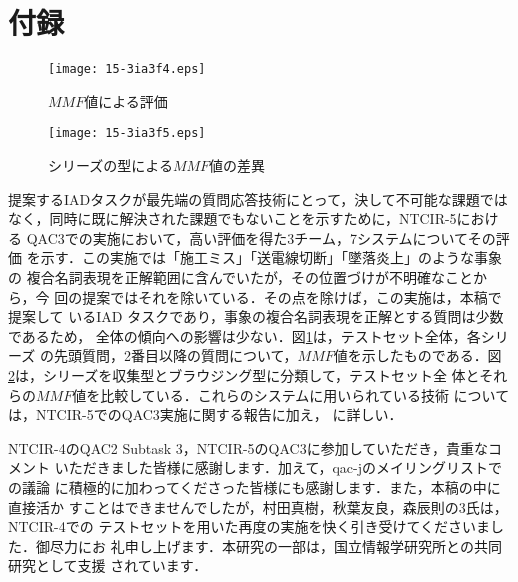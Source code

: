 \documentclass[japanese]{jnlp_1.4}
\begin{document}
\section*{付録}

\begin{figure}[b]
\centerline{\texttt{[image: 15-3ia3f4.eps]}}
\caption{$\mathit{MMF}$値による評価}
\label{mmf1}
\end{figure}
\begin{figure}[b]
\centerline{\texttt{[image: 15-3ia3f5.eps]}}
\caption{シリーズの型による$\mathit{MMF}$値の差異}
\label{mmf2}
\end{figure}

提案するIADタスクが最先端の質問応答技術にとって，決して不可能な課題では
なく，同時に既に解決された課題でもないことを示すために，NTCIR-5における
QAC3での実施において，高い評価を得た3チーム，7システムについてその評価
を示す．この実施では「施工ミス」「送電線切断」「墜落炎上」のような事象の
複合名詞表現を正解範囲に含んでいたが，その位置づけが不明確なことから，今
回の提案ではそれを除いている．その点を除けば，この実施は，本稿で提案して
いるIAD タスクであり，事象の複合名詞表現を正解とする質問は少数であるため，
全体の傾向への影響は少ない．図\ref{mmf1}は，テストセット全体，各シリーズ
の先頭質問，2番目以降の質問について，$\mathit{MMF}$値を示したものである．図
\ref{mmf2}は，シリーズを収集型とブラウジング型に分類して，テストセット全
体とそれらの$\mathit{MMF}$値を比較している．これらのシステムに用いられている技術
については，NTCIR-5でのQAC3実施に関する報告\cite{Kato05b,KatoJ06}に加え，
\cite{Murata07,Akiba06,Mori07}に詳しい．



\acknowledgment

NTCIR-4のQAC2 Subtask 3，NTCIR-5のQAC3に参加していただき，貴重なコメント
いただきました皆様に感謝します．加えて，qac-jのメイリングリストでの議論
に積極的に加わってくださった皆様にも感謝します．また，本稿の中に直接活か
すことはできませんでしたが，村田真樹，秋葉友良，森辰則の3氏は，NTCIR-4での
テストセットを用いた再度の実施を快く引き受けてくださいました．御尽力にお
礼申し上げます．本研究の一部は，国立情報学研究所との共同研究として支援
されています．
\end{document}

